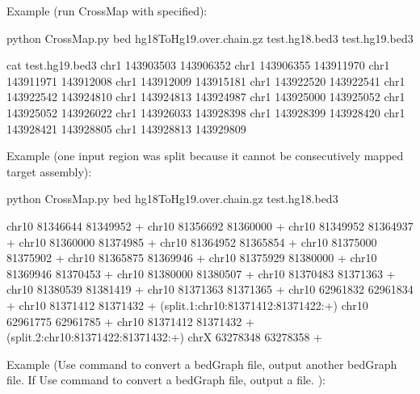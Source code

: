\documentclass[letterpaper,10pt,english]{sphinxmanual}
\begin{document}
Example (run CrossMap with   specified):

\begin{sphinxVerbatim}[commandchars=\\\{\}]
\PYGZdl{} python CrossMap.py bed hg18ToHg19.over.chain.gz test.hg18.bed3 test.hg19.bed3

\PYGZdl{} cat test.hg19.bed3
chr1   143903503       143906352
chr1   143906355       143911970
chr1   143911971       143912008
chr1   143912009       143915181
chr1   143922520       143922541
chr1   143922542       143924810
chr1   143924813       143924987
chr1   143925000       143925052
chr1   143925052       143926022
chr1   143926033       143928398
chr1   143928399       143928420
chr1   143928421       143928805
chr1   143928813       143929809
\end{sphinxVerbatim}

Example (one input region was split because it cannot be consecutively mapped target assembly):

\begin{sphinxVerbatim}[commandchars=\\\{\}]
\PYGZdl{} python CrossMap.py bed hg18ToHg19.over.chain.gz test.hg18.bed3

chr10  81346644        81349952        +       \PYGZhy{}\PYGZgt{}      chr10   81356692        81360000        +
chr10  81349952        81364937        +       \PYGZhy{}\PYGZgt{}      chr10   81360000        81374985        +
chr10  81364952        81365854        +       \PYGZhy{}\PYGZgt{}      chr10   81375000        81375902        +
chr10  81365875        81369946        +       \PYGZhy{}\PYGZgt{}      chr10   81375929        81380000        +
chr10  81369946        81370453        +       \PYGZhy{}\PYGZgt{}      chr10   81380000        81380507        +
chr10  81370483        81371363        +       \PYGZhy{}\PYGZgt{}      chr10   81380539        81381419        +
chr10  81371363        81371365        +       \PYGZhy{}\PYGZgt{}      chr10   62961832        62961834        +
chr10  81371412        81371432        +       (split.1:chr10:81371412:81371422:+)     chr10   62961775        62961785        +
chr10  81371412        81371432        +       (split.2:chr10:81371422:81371432:+)     chrX    63278348        63278358        +
\end{sphinxVerbatim}

Example (Use  command to convert a bedGraph file, output another bedGraph file. If Use  command to convert a bedGraph file, output a  file. ):
\end{document}
